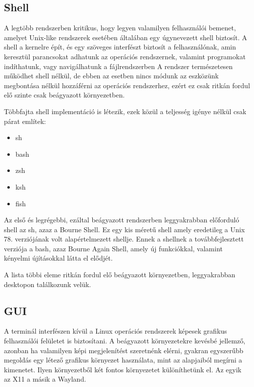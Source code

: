 \subsection{Shell}

A legtöbb rendszerben kritikus, hogy legyen valamilyen felhasználói bemenet,
amelyet Unix-like rendszerek esetében általában egy úgynevezett shell biztosít. A
shell a kernelre épít, és egy szöveges interfészt biztosít a felhasználónak, amin
keresztül parancsokat adhatunk az operációs rendszernek, valamint programokat
indíthatunk, vagy navigálhatunk a fájlrendszerben A rendszer természetesen
működhet shell nélkül, de ebben az esetben nincs módunk az eszközünk megbontása
nélkül hozzáférni az operációs rendszerhez, ezért ez csak ritkán fordul elő
szinte csak beágyazott környezetben.

Többfajta shell implementáció is létezik, ezek közül a teljesség igénye nélkül
csak párat említek:

\begin{itemize}
\item sh
\item bash
\item zsh
\item ksh
\item fish
\end{itemize}

Az első és legrégebbi, ezáltal beágyazott rendszerben leggyakrabban előforduló
shell az sh, azaz a Bourne Shell. Ez egy kis méretű shell amely eredetileg a Unix
78. verziójának volt alapértelmezett shellje. Ennek a shellnek a
továbbfejlesztett verziója a bash, azaz Bourne Again Shell, amely új funkciókkal,
valamint kényelmi újításokkal látta el elődjét.

A lista többi eleme ritkán fordul elő beágyazott környezetben, leggyakrabban
desktopon találkozunk velük.

\subsection{GUI}

A terminál interfészen kívül a Linux operációs rendszerek képesek grafikus
felhasználói felületet is biztosítani. A beágyazott környezetekre kevésbé
jellemző, azonban ha valamilyen képi megjelenítést szeretnénk elérni, gyakran
egyszerűbb megoldás egy létező grafikus környezet használata, mint az alapjaiból
megírni a kimenetet. Ilyen környezetből két fontos környezetet különíthetünk
el. Az egyik az X11 a másik a Wayland.

